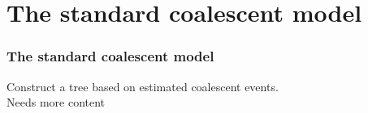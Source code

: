 \documentclass{beamer}
\begin{document}
\begin{frame}
            
        
        \end{frame}

    \section{The standard coalescent model}
        \begin{frame}
            \frametitle{The standard coalescent model}
            Construct a tree based on estimated coalescent events. \\

            Needs more content

        \end{frame}
\end{document}
